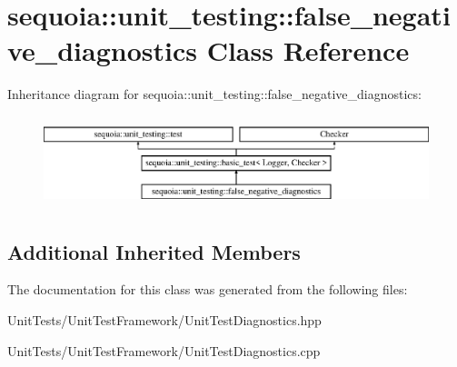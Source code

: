\hypertarget{classsequoia_1_1unit__testing_1_1false__negative__diagnostics}{}\section{sequoia\+::unit\+\_\+testing\+::false\+\_\+negative\+\_\+diagnostics Class Reference}
\label{classsequoia_1_1unit__testing_1_1false__negative__diagnostics}
Inheritance diagram for sequoia\+::unit\+\_\+testing\+::false\+\_\+negative\+\_\+diagnostics\+:\begin{figure}[H]
\begin{center}
\leavevmode
\includegraphics[height=2.666667cm]{classsequoia_1_1unit__testing_1_1false__negative__diagnostics}
\end{center}
\end{figure}
\subsection*{Additional Inherited Members}


The documentation for this class was generated from the following files\+:\begin{DoxyCompactItemize}
\item 
Unit\+Tests/\+Unit\+Test\+Framework/Unit\+Test\+Diagnostics.\+hpp\item 
Unit\+Tests/\+Unit\+Test\+Framework/Unit\+Test\+Diagnostics.\+cpp\end{DoxyCompactItemize}
